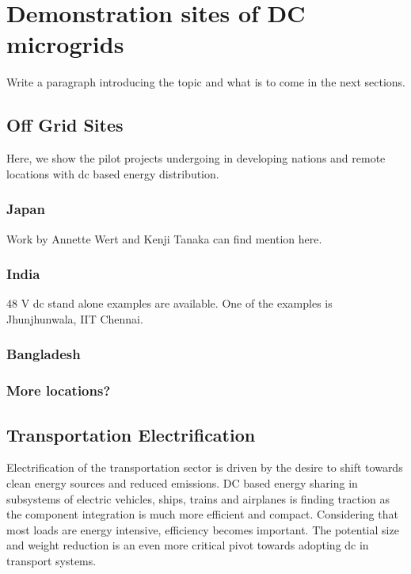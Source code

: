 \documentclass[10pt]{IETBook}
\begin{document}



\chapter{Demonstration sites of DC microgrids}

Write a paragraph introducing the topic and what is to come in the next sections.

\section{Off Grid Sites}
Here, we show the pilot projects undergoing in developing nations and remote locations with dc based energy distribution.
\subsection{Japan}
Work by Annette Wert and Kenji Tanaka can find mention here.
\subsection{India}

48 V dc stand alone examples are available. One of the examples is Jhunjhunwala, IIT Chennai.

\subsection{Bangladesh}
\subsection{More locations?}
\section{Transportation Electrification}
Electrification of the transportation sector is driven by the desire to shift towards clean energy sources and reduced emissions. DC based energy sharing in subsystems of electric vehicles, ships, trains and airplanes is finding traction as the component integration is much more efficient and compact. Considering that most loads are energy intensive, efficiency becomes important. The potential size and weight reduction is an even more critical pivot towards adopting dc in transport systems.
\end{document}
